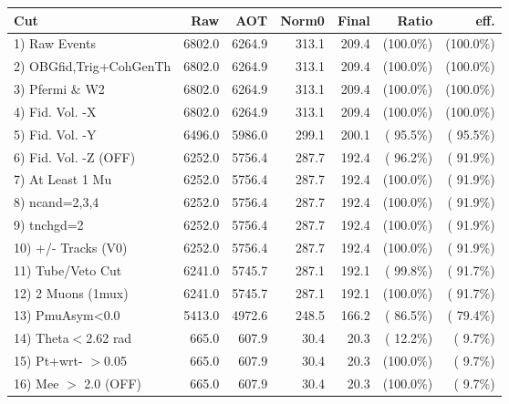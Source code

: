  \begin{table}[h!]\centering
 \begin{tabular}{||l||r|r|r|r|r|r||}
 \hline
 \hline
 Cut & Raw & AOT & Norm0 & Final & Ratio & eff.       \\
 \hline
  1) Raw Events           &       6802.0 &       6264.9 &        313.1 &        209.4 & (100.0\%) & (100.0\%) \\
  2) OBGfid,Trig+CohGenTh &       6802.0 &       6264.9 &        313.1 &        209.4 & (100.0\%) & (100.0\%) \\
  3) Pfermi \& W2         &       6802.0 &       6264.9 &        313.1 &        209.4 & (100.0\%) & (100.0\%) \\
  4) Fid. Vol. -X         &       6802.0 &       6264.9 &        313.1 &        209.4 & (100.0\%) & (100.0\%) \\
  5) Fid. Vol. -Y         &       6496.0 &       5986.0 &        299.1 &        200.1 & ( 95.5\%) & ( 95.5\%) \\
  6) Fid. Vol. -Z (OFF)   &       6252.0 &       5756.4 &        287.7 &        192.4 & ( 96.2\%) & ( 91.9\%) \\
  7) At Least 1 Mu        &       6252.0 &       5756.4 &        287.7 &        192.4 & (100.0\%) & ( 91.9\%) \\
  8) ncand=2,3,4          &       6252.0 &       5756.4 &        287.7 &        192.4 & (100.0\%) & ( 91.9\%) \\
  9) tnchgd=2             &       6252.0 &       5756.4 &        287.7 &        192.4 & (100.0\%) & ( 91.9\%) \\
 10) +/- Tracks (V0)      &       6252.0 &       5756.4 &        287.7 &        192.4 & (100.0\%) & ( 91.9\%) \\
 11) Tube/Veto Cut        &       6241.0 &       5745.7 &        287.1 &        192.1 & ( 99.8\%) & ( 91.7\%) \\
 12) 2 Muons (1mux)       &       6241.0 &       5745.7 &        287.1 &        192.1 & (100.0\%) & ( 91.7\%) \\
 13) PmuAsym<0.0          &       5413.0 &       4972.6 &        248.5 &        166.2 & ( 86.5\%) & ( 79.4\%) \\
 14) Theta$<$2.62 rad     &        665.0 &        607.9 &         30.4 &         20.3 & ( 12.2\%) & (  9.7\%) \\
 15) Pt+wrt- $>$0.05      &        665.0 &        607.9 &         30.4 &         20.3 & (100.0\%) & (  9.7\%) \\
 16) Mee $>$ 2.0  (OFF)   &        665.0 &        607.9 &         30.4 &         20.3 & (100.0\%) & (  9.7\%) \\

\end{tabular}
\end{table}

